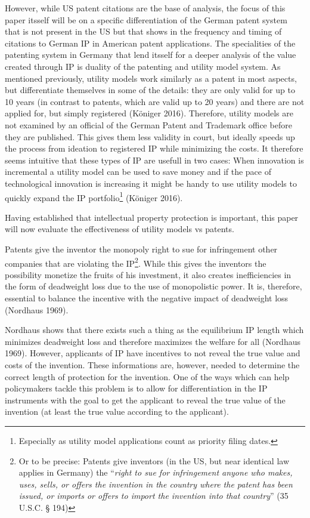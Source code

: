 \documentclass[
  12pt,
]{article}
\begin{document}
However, while US patent citations are the base of analysis, the focus
of this paper itsself will be on a specific differentiation of the
German patent system that is not present in the US but that shows in the
frequency and timing of citations to German IP in American patent
applications. The specialities of the patenting system in Germany that
lend itsself for a deeper analysis of the value created through IP is
duality of the patenting and utility model system. As mentioned
previously, utility models work similarly as a patent in most aspects,
but differentiate themselves in some of the details: they are only valid
for up to 10 years (in contrast to patents, which are valid up to 20
years) and there are not applied for, but simply registered (Königer
2016). Therefore, utility models are not examined by an official of the
German Patent and Trademark office before they are published. This gives
them less validity in court, but ideally speeds up the process from
ideation to registered IP while minimizing the costs. It therefore seems
intuitive that these types of IP are usefull in two cases: When
innovation is incremental a utility model can be used to save money and
if the pace of technological innovation is increasing it might be handy
to use utility models to quickly expand the IP portfolio\footnote{Especially
  as utility model applications count as priority filing dates.}
(Königer 2016).

Having established that intellectual property protection is important,
this paper will now evaluate the effectiveness of utility models vs
patents.

Patents give the inventor the monopoly right to sue for infringement
other companies that are violating the IP\footnote{Or to be precise:
  Patents give inventors (in the US, but near identical law applies in
  Germany) the ``\emph{right to sue for infringement anyone who makes,
  uses, sells, or offers the invention in the country where the patent
  has been issued, or imports or offers to import the invention into
  that country}'' (35 U.S.C. § 194)}. While this gives the inventors the
possibility monetize the fruits of his investment, it also creates
inefficiencies in the form of deadweight loss due to the use of
monopolistic power. It is, therefore, essential to balance the incentive
with the negative impact of deadweight loss (Nordhaus 1969).

Nordhaus shows that there exists such a thing as the equilibrium IP
length which minimizes deadweight loss and therefore maximizes the
welfare for all (Nordhaus 1969). However, applicants of IP have
incentives to not reveal the true value and costs of the invention.
These informations are, however, needed to determine the correct length
of protection for the invention. One of the ways which can help
policymakers tackle this problem is to allow for differentiation in the
IP instruments with the goal to get the applicant to reveal the true
value of the invention (at least the true value according to the
applicant).
\end{document}
